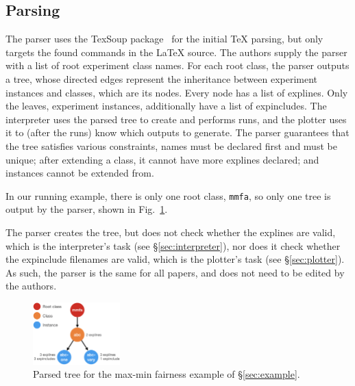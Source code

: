 
\subsection{Parsing \experimentex}
\label{sec:parser}

The parser uses the TexSoup package~\cite{texsoup} for the initial TeX parsing, but only targets the found \experimentex commands in the \LaTeX{} source. The authors supply the parser with a list of root experiment class names. For each root class, the parser outputs a tree, whose directed edges represent the inheritance between experiment instances and classes, which are its nodes. Every node has a list of explines. Only the leaves, \ie experiment instances, additionally have a list of expincludes. The interpreter uses the parsed tree to create and performs runs, and the plotter uses it to (after the runs) know which outputs to generate. The parser guarantees that the tree satisfies various constraints, \eg names must be declared first and must be unique; after extending a class, it cannot have more explines declared; and instances cannot be extended from.

In our running example, there is only one root class, \texttt{mmfa}, so only one tree is output by the parser, shown in Fig.~\ref{fig:parsed-tree}.

The parser creates the tree, but does not check whether the explines are valid, which is the interpreter's task (see \S\ref{sec:interpreter}), nor does it check whether the expinclude filenames are valid, which is the plotter's task (see \S\ref{sec:plotter}). As such, the parser is the same for all \sysname papers, and does not need to be edited by the authors.

\begin{figure}
    \centering
    \includegraphics[width=0.3\textwidth]{figures/parsed-tree.png}
    \caption{Parsed tree for the max-min fairness example of \S\ref{sec:example}.}
    \label{fig:parsed-tree}
    \vspace{-14pt}
\end{figure}

